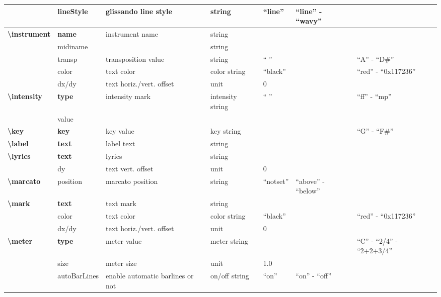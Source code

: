 \documentclass[a4paper, landscape, 10pt]{article}
\begin{document}
\begin{tabularx}{\linewidth}{p{3cm}p{2cm}p{5cm}p{3cm}p{3.5cm}p{3.5cm}p{4cm}}
    &lineStyle&glissando line style&string&``line''&``line'' - ``wavy''&\\ %
    \hline
    \textbf{\textbackslash{}instrument}&\textbf{name}&instrument name&string&&&\\
    &midiname&&string&&&\\ %
    &transp&transposition value&string&`` ''&&``A'' - ``D\#''\\
    &color&text color&color string&``black''&&``red'' - ``0x117236''\\
    &dx/dy&text horiz./vert. offset&unit&0&&\\
    \hline
    \textbf{\textbackslash{}intensity}&\textbf{type}&intensity mark&intensity string&`` ''&&``ff'' - ``mp''\\
    &value&&&&&\\ %
    \hline
    \textbf{\textbackslash{}key}&\textbf{key}&key value&key string&&&``G'' - ``F\#''\\
    \hline
    \textbf{\textbackslash{}label}&\textbf{text}&label text&string&&&\\
    \hline
    \textbf{\textbackslash{}lyrics}&\textbf{text}&lyrics&string&&&\\
    &dy&text vert. offset&unit&0&&\\
    \hline
    \textbf{\textbackslash{}marcato}&position&marcato position&string&``notset''&``above'' - ``below''&\\
    \hline
    \textbf{\textbackslash{}mark}&\textbf{text}&text mark&string&&&\\
    &color&text color&color string&``black''&&``red'' - ``0x117236''\\
    &dx/dy&text horiz./vert. offset&unit&0&&\\
    \hline
    \textbf{\textbackslash{}meter}&\textbf{type}&meter value&meter string&&&``C'' - ``2/4'' - ``2+2+3/4''\\
    &size&meter size&unit&1.0&&\\
    &autoBarLines&enable automatic barlines or not&on/off string&``on''&``on'' - ``off''&\\
    \hline
\end{tabularx}
\end{document}
